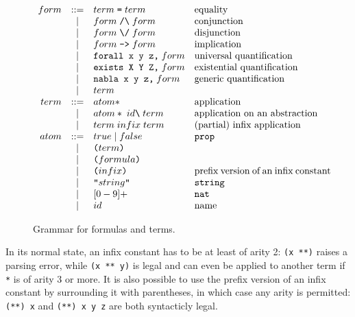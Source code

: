 \documentclass{article}
\begin{document}
\begin{figure}
\[\begin{array}{rclp{5cm}}
form &::=& term\;\verb.=.\;term         & equality \\
     & | & form\;\verb./\.\;form        & conjunction \\
     & | & form\;\verb.\/.\;form        & disjunction \\
     & | & form\;\verb.->.\;form        & implication \\
     & | & \verb.forall x y z,.\;form   & universal quantification \\
     & | & \verb.exists X Y Z,.\;form   & existential quantification \\
     & | & \verb.nabla x y z,.\;form    & generic quantification \\
     & | & term                         & \\
term &::=& atom*                        & application \\
     & | & atom*\;id\verb.\.\;term      & application on an
                                          abstraction \\
     & | & term\;infix\;term            & (partial) infix application \\
atom &::=& true\;|\;false               & {\tt prop} \\
     & | & \verb.(.term\verb.).         & \\
     & | & \verb.(.formula\verb.).      & \\
     & | & \verb.(.infix\verb.).        & prefix version of an infix
                                          constant\\
     & | & \verb.".string\verb.".       & {\tt string} \\
     & | & [0-9]+                       & {\tt nat} \\
     & | & id                           & name \\
\end{array}\]
\caption{Grammar for formulas and terms.}
\label{concrete}
\end{figure}

In its normal state, an infix constant has to be at least of arity 2:
{\tt (x **)} raises a parsing error, while {\tt (x ** y)} is legal and
can even be applied to another term if {\tt **} is of arity 3 or more.
It is also possible to use the prefix version of an infix constant by
surrounding it with parentheses, in which case any arity is permitted:
{\tt (**) x} and {\tt (**) x y z} are both syntacticly legal.
\end{document}
